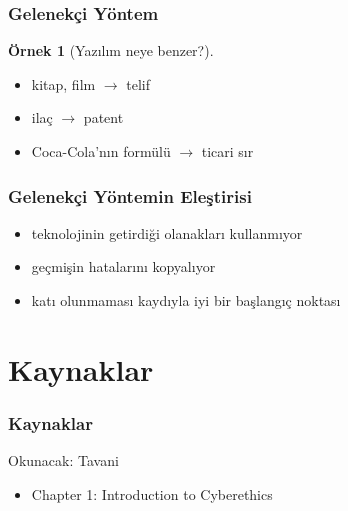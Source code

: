 \documentclass[dvipsnames]{beamer}
\theoremstyle{definition}
\theoremstyle{example}
\newtheorem{ornek}[theorem]{Örnek}
\theoremstyle{plain}
\begin{document}
\begin{frame}
  \frametitle{Gelenekçi Yöntem}

  \begin{ornek}[Yazılım neye benzer?]
    \begin{itemize}
      \item kitap, film $\rightarrow$ telif
      \item ilaç $\rightarrow$ patent
      \item Coca-Cola'nın formülü $\rightarrow$ ticari sır
    \end{itemize}
  \end{ornek}
\end{frame}

\begin{frame}
  \frametitle{Gelenekçi Yöntemin Eleştirisi}

  \begin{itemize}
    \item teknolojinin getirdiği olanakları kullanmıyor
    \item geçmişin hatalarını kopyalıyor

    \pause
    \bigskip
    \item katı olunmaması kaydıyla iyi bir başlangıç noktası
  \end{itemize}
\end{frame}

\section*{Kaynaklar}

\begin{frame}
  \frametitle{Kaynaklar}

  \begin{block}{Okunacak: Tavani}
    \begin{itemize}
      \item Chapter 1: \alert{Introduction to Cyberethics}
    \end{itemize}
  \end{block}
\end{frame}
\end{document}
